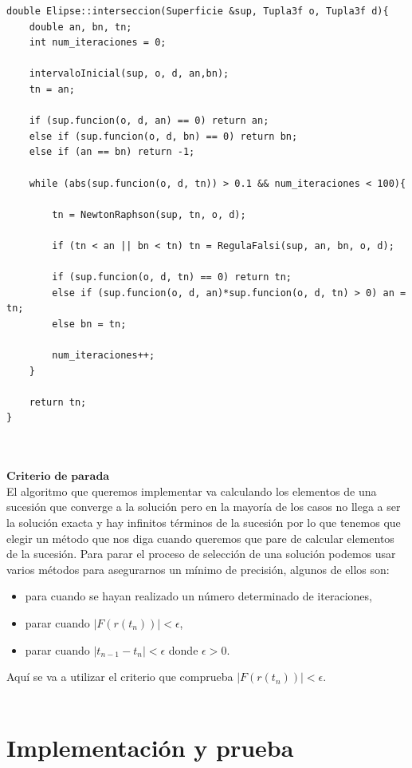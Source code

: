 \begin{lstlisting}[style=Consola]
double Elipse::interseccion(Superficie &sup, Tupla3f o, Tupla3f d){
	double an, bn, tn;
	int num_iteraciones = 0;

	intervaloInicial(sup, o, d, an,bn);
	tn = an;
	
	if (sup.funcion(o, d, an) == 0) return an;
	else if (sup.funcion(o, d, bn) == 0) return bn;
	else if (an == bn) return -1;

	while (abs(sup.funcion(o, d, tn)) > 0.1 && num_iteraciones < 100){
	
		tn = NewtonRaphson(sup, tn, o, d);
		
		if (tn < an || bn < tn) tn = RegulaFalsi(sup, an, bn, o, d);
		
		if (sup.funcion(o, d, tn) == 0) return tn;
		else if (sup.funcion(o, d, an)*sup.funcion(o, d, tn) > 0) an = tn;
		else bn = tn;
		
		num_iteraciones++;
	}
	
	return tn;
}
\end{lstlisting}
${ }$\\

${ }$\\
$\textbf{Criterio de parada}$
${ }$\\

El algoritmo que queremos implementar va calculando los elementos de una sucesión que converge a la solución pero en la mayoría de los casos no llega a ser la solución exacta y hay infinitos términos de la sucesión por lo que tenemos que elegir un método que nos diga cuando queremos que pare de calcular elementos de la sucesión. Para parar el proceso de selección de una solución podemos usar varios métodos para asegurarnos un mínimo de precisión, algunos de ellos son:
\begin{itemize}
	\item para cuando se hayan realizado un número determinado de iteraciones,
	\item parar cuando $|F(r(t_n))| < \epsilon$,
	\item parar cuando $|t_{n-1} - t_n| < \epsilon$ donde $\epsilon > 0$.
\end{itemize}
Aquí se va a utilizar el criterio que comprueba $|F(r(t_n))| < \epsilon$.
${ }$\\




${ }$\\
\section{Implementación y prueba}
${ }$\\

